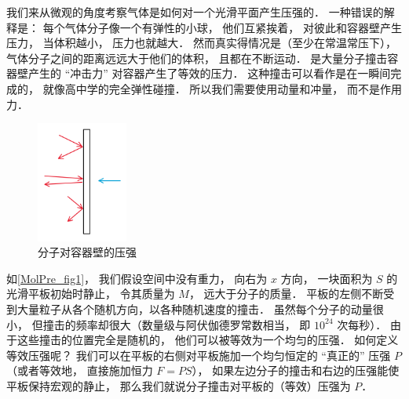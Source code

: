 

我们来从微观的角度考察气体是如何对一个光滑平面产生压强的． 一种错误的解释是： 每个气体分子像一个有弹性的小球， 他们互紧挨着， 对彼此和容器壁产生压力， 当体积越小， 压力也就越大． 然而真实得情况是（至少在常温常压下）， 气体分子之间的距离远远大于他们的体积， 且都在不断运动． 是大量分子撞击容器壁产生的 “冲击力” 对容器产生了等效的压力． 这种撞击可以看作是在一瞬间完成的， 就像高中学的完全弹性碰撞． 所以我们需要使用动量和冲量， 而不是作用力．

\begin{figure}[ht]
\centering
\includegraphics[width=3cm]{./figures/MolPre1.png}
\caption{分子对容器壁的压强} \label{MolPre_fig1}
\end{figure}

如\autoref{MolPre_fig1}， 我们假设空间中没有重力， 向右为 $x$ 方向， 一块面积为 $S$ 的光滑平板初始时静止， 令其质量为 $M$， 远大于分子的质量． 平板的左侧不断受到大量粒子从各个随机方向，以各种随机速度的撞击． 虽然每个分子的动量很小， 但撞击的频率却很大（数量级与阿伏伽德罗常数相当， 即 $10^{24}$ 次每秒）． 由于这些撞击的位置完全是随机的， 他们可以被等效为一个均匀的压强． 如何定义等效压强呢？ 我们可以在平板的右侧对平板施加一个均匀恒定的 “真正的” 压强 $P$ （或者等效地， 直接施加恒力 $F = PS$）， 如果左边分子的撞击和右边的压强能使平板保持宏观的静止， 那么我们就说分子撞击对平板的（等效）压强为 $P$．

